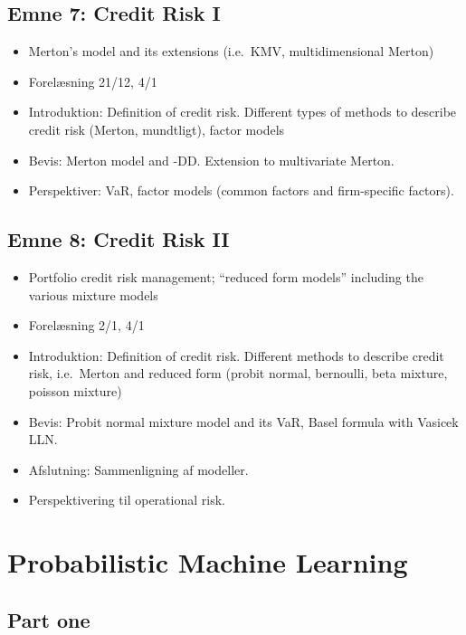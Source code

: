 \documentclass[a4paper,12pt,openany]{book}
\providecommand{\tightlist}{%
 \setlength{\itemsep}{0pt}\setlength{\parskip}{0pt}}
\begin{document}
\hypertarget{emne-7-credit-risk-i}{%
\section{Emne 7: Credit Risk I}\label{emne-7-credit-risk-i}}

\begin{itemize}
\tightlist
\item
  Merton's model and its extensions (i.e.~KMV, multidimensional Merton)
\item
  Forelæsning 21/12, 4/1
\item
  Introduktion: Definition of credit risk. Different types of methods to describe credit risk (Merton, mundtligt), factor models
\item
  Bevis: Merton model and -DD. Extension to multivariate Merton.
\item
  Perspektiver: VaR, factor models (common factors and firm-specific factors).
\end{itemize}

\hypertarget{emne-8-credit-risk-ii}{%
\section{Emne 8: Credit Risk II}\label{emne-8-credit-risk-ii}}

\begin{itemize}
\tightlist
\item
  Portfolio credit risk management; ``reduced form models'' including the various mixture models
\item
  Forelæsning 2/1, 4/1
\item
  Introduktion: Definition of credit risk. Different methods to describe credit risk, i.e.~Merton and reduced form (probit normal, bernoulli, beta mixture, poisson mixture)
\item
  Bevis: Probit normal mixture model and its VaR, Basel formula with Vasicek LLN.
\item
  Afslutning: Sammenligning af modeller.
\item
  Perspektivering til operational risk.
\end{itemize}

\hypertarget{probabilistic-machine-learning}{%
\chapter{Probabilistic Machine Learning}\label{probabilistic-machine-learning}}

\hypertarget{part-one}{%
\section{Part one}\label{part-one}}
\end{document}
